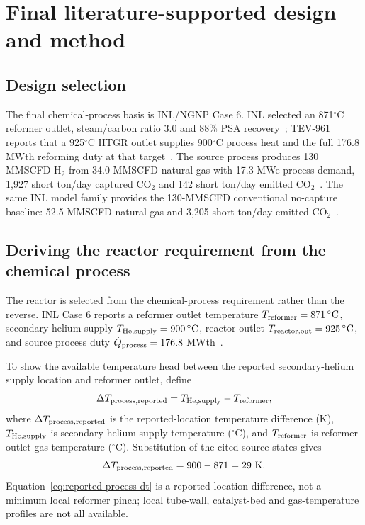 \section{Final literature-supported design and method}
\label{sec:final-design}

\subsection{Design selection}
The final chemical-process basis is INL/NGNP Case 6. INL selected an 871$^\circ$C reformer outlet, steam/carbon ratio 3.0 and 88\% PSA recovery~\cite{inltev953}; TEV-961 reports that a 925$^\circ$C HTGR outlet supplies 900$^\circ$C process heat and the full 176.8 MWth reforming duty at that target~\cite{inltev961}. The source process produces 130 MMSCFD H$_2$ from 34.0 MMSCFD natural gas with 17.3 MWe process demand, 1,927 short ton/day captured CO$_2$ and 142 short ton/day emitted CO$_2$~\cite{inltev961}. The same INL model family provides the 130-MMSCFD conventional no-capture baseline: 52.5 MMSCFD natural gas and 3,205 short ton/day emitted CO$_2$~\cite{inltev953}.

\subsection{Deriving the reactor requirement from the chemical process}
The reactor is selected from the chemical-process requirement rather than the reverse. INL Case 6 reports a reformer outlet temperature $T_{\rm reformer}=871\,^{\circ}\mathrm C$, secondary-helium supply $T_{\rm He,supply}=900\,^{\circ}\mathrm C$, reactor outlet $T_{\rm reactor,out}=925\,^{\circ}\mathrm C$, and source process duty $\dot Q_{\rm process}=176.8$ MWth~\cite{inltev953,inltev961}.

To show the available temperature head between the reported secondary-helium supply location and reformer outlet, define
\begin{equation}\label{eq:reported-process-dt-general}
\Delta T_{\rm process,reported}
=T_{\rm He,supply}-T_{\rm reformer},
\end{equation}
where $\Delta T_{\rm process,reported}$ is the reported-location temperature difference (K), $T_{\rm He,supply}$ is secondary-helium supply temperature ($^{\circ}$C), and $T_{\rm reformer}$ is reformer outlet-gas temperature ($^{\circ}$C). Substitution of the cited source states gives
\begin{equation}\label{eq:reported-process-dt}
\Delta T_{\rm process,reported}
=900-871=29~\mathrm K.
\end{equation}
Equation~\ref{eq:reported-process-dt} is a reported-location difference, not a minimum local reformer pinch; local tube-wall, catalyst-bed and gas-temperature profiles are not all available.


